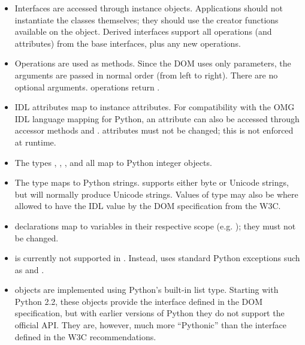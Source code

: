 \begin{itemize}
\item Interfaces are accessed through instance objects. Applications
      should not instantiate the classes themselves; they should use
      the creator functions available on the  object.
      Derived interfaces support all operations (and attributes) from
      the base interfaces, plus any new operations.

\item Operations are used as methods. Since the DOM uses only
       parameters, the arguments are passed in normal
      order (from left to right).   There are no optional
      arguments.  operations return .

\item IDL attributes map to instance attributes. For compatibility
      with the OMG IDL language mapping for Python, an attribute
       can also be accessed through accessor methods
       and .  
      attributes must not be changed; this is not enforced at
      runtime.

\item The types , , , and  all map to Python integer
      objects.

\item The type  maps to Python strings.
       supports either byte or Unicode
      strings, but will normally produce Unicode strings.  Values
      of type  may also be  where allowed
      to have the IDL  value by the DOM specification from
      the W3C.

\item {} declarations map to variables in their
      respective scope
      (e.g. );
      they must not be changed.

\item {} is currently not supported in
      .  Instead,
       uses standard Python exceptions such
      as  and .

\item {} objects are implemented using Python's built-in
      list type.  Starting with Python 2.2, these objects provide the
      interface defined in the DOM specification, but with earlier
      versions of Python they do not support the official API.  They
      are, however, much more ``Pythonic'' than the interface defined
      in the W3C recommendations.
\end{itemize}


